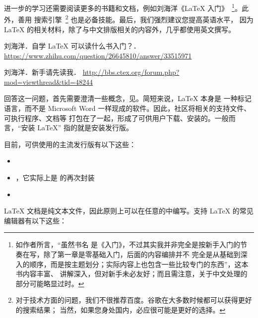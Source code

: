 进一步的学习还需要阅读更多的书籍和文档，例如刘海洋《\LaTeX{} 入门》~\footnote{如作者所言，“虽然书名
是《入门》，不过其实我并非完全是按新手入门的节奏在写，除了第一章是零基础入门，后面的内容编排并不
完全是从基础到深入的顺序，而是按主题划分；实际内容上也包含一些比较专门的东西”，这本书内容丰富、
讲解深入，但对新手未必友好；而且需注意，关于中文处理的部分可能略显过时。}。此外，善用
搜索引擎~\footnote{对于技术方面的问题，我们不很推荐百度。谷歌在大多数时候都可以获得更好的搜索结果；
当然，如果您身处国内，必应很可能是更好的选择。} 也是必备技能。最后，我们强烈建议您提高英语水平，
因为 \LaTeX{} 的相关材料，除了与中文排版相关的内容外，几乎都使用英文撰写。

\begin{reference}
  \item 刘海洋．自学 \LaTeX{} 可以读什么书入门？．
    \url{https://www.zhihu.com/question/26645810/answer/33515971}
  \item 刘海洋．新手请先读我．
    \url{http://bbs.ctex.org/forum.php?mod=viewthread&tid=48244}
\end{reference}



回答这一问题，首先需要澄清一些概念，见。简短来说，\LaTeX{} 本身是
一种标记语言，而不是 Microsoft Word 一样现成的软件。因此，社区将相关的支持文件、可执行程序、文档等
打包在了一起，形成了可供用户下载、安装的。一般而言，“安装 \LaTeX{}”
指的就是安装发行版。

目前，可供使用的主流发行版有以下这些：

\begin{itemize}
  \item \TeXLive{}
  \item \MacTeX{}，它实际上是 \TeXLive{} 的再次封装
  \item \MiKTeX{}
\end{itemize}



\LaTeX{} 文档是纯文本文件，因此原则上可以在任意的中编写。支持 \LaTeX{} 的常见
编辑器有以下这些：

